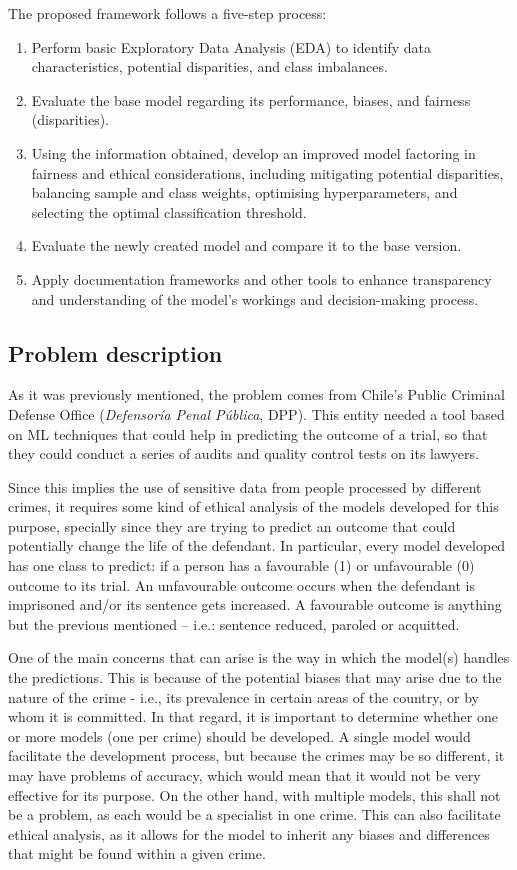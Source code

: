 \documentclass[twoside,11pt]{article}
\begin{document}
The proposed framework follows a five-step process:

\begin{enumerate}
    \item Perform basic Exploratory Data Analysis (EDA) to identify data characteristics, potential disparities, and class imbalances.
    \item Evaluate the base model regarding its performance, biases, and fairness (disparities).
    \item Using the information obtained, develop an improved model factoring in fairness and ethical considerations, including mitigating potential disparities, balancing sample and class weights, optimising hyperparameters, and selecting the optimal classification threshold.
    \item Evaluate the newly created model and compare it to the base version.
    \item Apply documentation frameworks and other tools to enhance transparency and understanding of the model's workings and decision-making process.
\end{enumerate}

\subsection{Problem description}

As it was previously mentioned, the problem comes from Chile's Public Criminal Defense Office (\textit{Defensoría Penal Pública}, DPP). This entity needed a tool based on ML techniques that could help in predicting the outcome of a trial, so that they could conduct a series of audits and quality control tests on its lawyers. 

Since this implies the use of sensitive data from people processed by different crimes, it requires some kind of ethical analysis of the models developed for this purpose, specially since they are trying to predict an outcome that could potentially change the life of the defendant. In particular, every model developed has one class to predict: if a person has a favourable (1) or unfavourable (0) outcome to its trial. An unfavourable outcome occurs when the defendant is imprisoned and/or its sentence gets increased. A favourable outcome is anything but the previous mentioned -- i.e.: sentence reduced, paroled or acquitted. 

One of the main concerns that can arise is the way in which the model(s) handles the predictions. This is because of the potential biases that may arise due to the nature of the crime - i.e., its prevalence in certain areas of the country, or by whom it is committed. In that regard, it is important to determine whether one or more models (one per crime) should be developed. A single model would facilitate the development process, but because the crimes may be so different, it may have problems of accuracy, which would mean that it would not be very effective for its purpose. On the other hand, with multiple models, this shall not be a problem, as each would be a specialist in one crime. This can also facilitate ethical analysis, as it allows for the model to inherit any biases and differences that might be found within a given crime.
\end{document}
